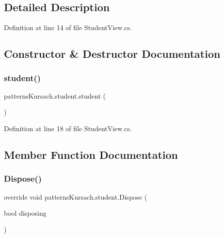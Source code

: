 \subsection{Detailed Description}


Definition at line 14 of file Student\+View.\+cs.



\subsection{Constructor \& Destructor Documentation}
\mbox{\label{classpatterns_kursach_1_1student_abd0837e0e333877deea0dd7fc79af488}} 
\subsubsection{\texorpdfstring{student()}{student()}}
{\footnotesize\ttfamily patterns\+Kursach.\+student.\+student (\begin{DoxyParamCaption}{ }\end{DoxyParamCaption})}



Definition at line 18 of file Student\+View.\+cs.



\subsection{Member Function Documentation}
\mbox{\label{classpatterns_kursach_1_1student_af69ff0dce6cd87c18aebf494b31a9e91}} 
\subsubsection{\texorpdfstring{Dispose()}{Dispose()}}
{\footnotesize\ttfamily override void patterns\+Kursach.\+student.\+Dispose (\begin{DoxyParamCaption}\item[{bool}]{disposing }\end{DoxyParamCaption})\hspace{0.3cm}{\ttfamily [protected]}}



